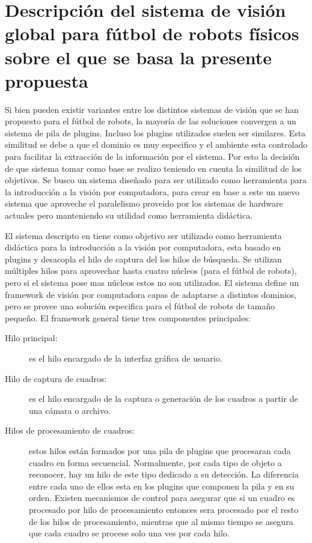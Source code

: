 
\section{Descripción del sistema de visión global para fútbol de robots
físicos sobre el que se basa la presente propuesta}

Si bien pueden existir variantes entre los distintos sistemas de visión que se
han propuesto para el fútbol de robots, la mayoría de las soluciones convergen a
un sistema de pila de plugins. Incluso los plugins utilizados suelen ser
similares. Esta similitud se debe a que el dominio es muy especifico y el
ambiente esta controlado para facilitar la extracción de la información por el
sistema. Por esto la decisión de que sistema tomar como base se realizo teniendo
en cuenta la similitud de los objetivos. Se busco un sistema diseñado para ser
utilizado como herramienta para la introducción a la visión por computadora,
para crear en base a este un nuevo sistema que aproveche el paralelismo proveido
por los sistemas de hardware actuales pero manteniendo su utilidad como
herramienta didáctica.

El sistema descripto en \cite{torres2014} tiene como objetivo ser utilizado como
herramienta didáctica para la introducción a la visión por computadora, esta
basado en plugins y desacopla el hilo de captura del los hilos de búsqueda. Se
utilizan múltiples hilos para aprovechar hasta cuatro núcleos (para el fútbol de
robots), pero si el sistema pose mas núcleos estos no son utilizados. El sistema
define un framework de visión por computadora capas de adaptarse a distintos
dominios, pero se provee una solución especifica para el fútbol de robots de
tamaño pequeño. El framework general tiene tres componentes principales:

\begin{description}

	\item[Hilo principal:] es el hilo encargado de la interfaz gráfica de
		usuario.
	
	\item[Hilo de captura de cuadros:] es el hilo encargado de la captura o
		generación de los cuadros a partir de una cámara o archivo.

	\item[Hilos de procesamiento de cuadros:] estos hilos están formados por
		una pila de plugins que procesaran cada cuadro en forma
		secuencial. Normalmente, por cada tipo de objeto a reconocer,
		hay un hilo de este tipo dedicado a su detección. La diferencia
		entre cada uno de ellos esta en los plugins que componen la pila
		y en su orden. Existen mecanismos de control para asegurar que
		si un cuadro es procesado por hilo de procesamiento entonces
		sera procesado por el resto de los hilos de procesamiento,
		mientras que al mismo tiempo se asegura que cada cuadro se
		procese solo una ves por cada hilo.

\end{description}

